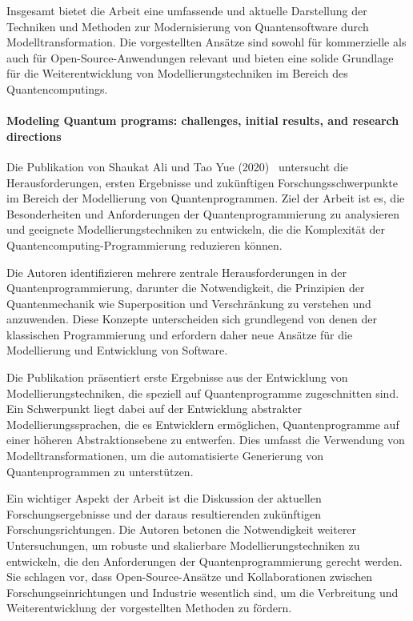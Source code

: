 Insgesamt bietet die Arbeit eine umfassende und aktuelle Darstellung der Techniken und Methoden zur Modernisierung 
von Quantensoftware durch Modelltransformation. Die vorgestellten Ansätze sind sowohl für kommerzielle als auch 
für Open-Source-Anwendungen relevant und bieten eine solide Grundlage für die Weiterentwicklung von 
Modellierungstechniken im Bereich des Quantencomputings.

\paragraph{Modeling Quantum programs: challenges, initial results, and research directions}

Die Publikation von Shaukat Ali und Tao Yue (2020)~\cite{ali2020modeling} untersucht die Herausforderungen, ersten Ergebnisse und 
zukünftigen Forschungsschwerpunkte im Bereich der Modellierung von Quantenprogrammen. Ziel der Arbeit ist es, 
die Besonderheiten und Anforderungen der Quantenprogrammierung zu analysieren und geeignete Modellierungstechniken 
zu entwickeln, die die Komplexität der Quantencomputing-Programmierung reduzieren können.

Die Autoren identifizieren mehrere zentrale Herausforderungen in der Quantenprogrammierung, darunter die 
Notwendigkeit, die Prinzipien der Quantenmechanik wie Superposition und Verschränkung zu verstehen und anzuwenden. 
Diese Konzepte unterscheiden sich grundlegend von denen der klassischen Programmierung und erfordern daher neue 
Ansätze für die Modellierung und Entwicklung von Software.

Die Publikation präsentiert erste Ergebnisse aus der Entwicklung von Modellierungstechniken, die speziell auf 
Quantenprogramme zugeschnitten sind. Ein Schwerpunkt liegt dabei auf der Entwicklung abstrakter Modellierungssprachen, 
die es Entwicklern ermöglichen, Quantenprogramme auf einer höheren Abstraktionsebene zu entwerfen. Dies umfasst die 
Verwendung von Modelltransformationen, um die automatisierte Generierung von Quantenprogrammen zu unterstützen.

Ein wichtiger Aspekt der Arbeit ist die Diskussion der aktuellen Forschungsergebnisse und der daraus resultierenden 
zukünftigen Forschungsrichtungen. Die Autoren betonen die Notwendigkeit weiterer Untersuchungen, um robuste und 
skalierbare Modellierungstechniken zu entwickeln, die den Anforderungen der Quantenprogrammierung gerecht werden. 
Sie schlagen vor, dass Open-Source-Ansätze und Kollaborationen zwischen Forschungseinrichtungen und Industrie 
wesentlich sind, um die Verbreitung und Weiterentwicklung der vorgestellten Methoden zu fördern.

